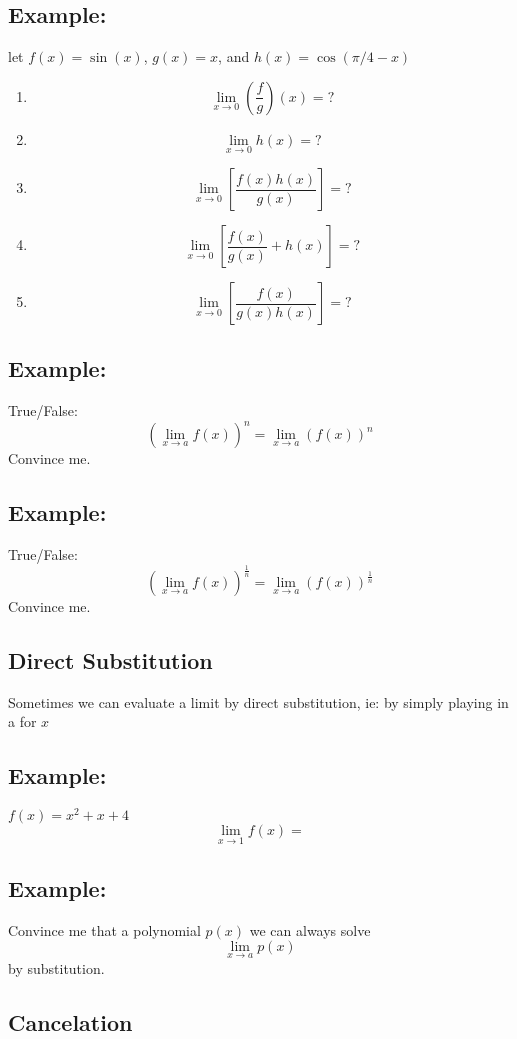 \documentclass[20pt]{extarticle}
\newcommand{\LP}{\left(}
\newcommand{\RP}{\right)}
\newcommand{\LB}{\left[}
\newcommand{\RB}{\right]}
\begin{document}
\subsection*{\textbf{\color{draculared}Example:}}
let \(f(x)=\sin\LP x\RP\), \(g(x)=x\), and \(h(x)=\cos (\pi / 4-x)\)
\begin{enumerate}
  \item{\[\lim _{x \rightarrow 0} \LP\frac{f}{g}\RP(x)=?\]}
  \item{\[\lim _{x \rightarrow 0} h(x)=?\]}
  \item{\[\lim _{x \rightarrow 0} \LB\frac{f(x)h(x)}{g(x)}\RB=?\]}
  \item{\[\lim _{x \rightarrow 0} \LB\frac{f(x)}{g(x)}+h(x)\RB=?\]}
  \item{\[\lim _{x \rightarrow 0} \LB\frac{f(x)}{g(x)h(x)}\RB=?\]}
\end{enumerate}
\newpage
\newpage
\subsection*{\textbf{\color{draculared}Example:}}
True/False:
\[\left(\lim _{x \to a} f(x)\right)^n=\lim _{x \to a}\LP f(x)\RP^n\]
Convince me.
\newpage
\subsection*{\textbf{\color{draculared}Example:}}
True/False:
\[\left(\lim _{x \to a} f(x)\right)^{\frac{1}{n}}=\lim _{x \to a}\LP f(x)\RP^{\frac{1}{n}}\]
Convince me.
\newpage
\subsection*{\textbf{\color{draculaorange}Direct Substitution}}
Sometimes we can evaluate a limit by direct substitution, ie: by
simply playing in a for $x$
\subsection*{\textbf{\color{draculared}Example:}}
\(f(x)=x^2+x+4\)
\[\lim_{x \rightarrow 1} f(x)=\]
\newpage
\subsection*{\textbf{\color{draculared}Example:}}
Convince me that a polynomial \(p(x)\) we can always solve
\[\lim_{x \rightarrow a} p(x)\]
by substitution.
\newpage
\subsection*{\textbf{\color{draculaorange}Cancelation}}
\end{document}
